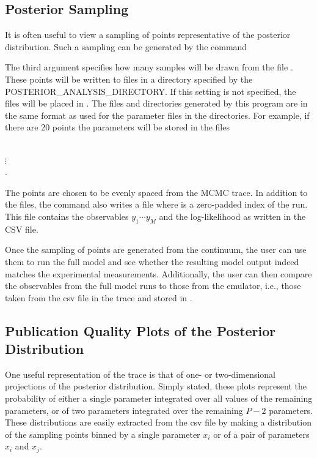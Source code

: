  \subsection{Posterior Sampling}\label{subsec:PosteriorSampling}

 It is often useful to view a sampling of points
 representative of the posterior distribution. Such a
 sampling can be generated by the command


The third argument specifies how many samples will be drawn from the file . These points will be written to files in a directory specified by the POSTERIOR\_ANALYSIS\_DIRECTORY. If this setting is not specified, the files will be placed in . The files and directories generated by this program are in the same format as used for the
 parameter files in the  directories. For
 example, if there are 20 points the parameters will be
 stored in the files

\\
$\vdots$\\
.

 The points are chosen to be evenly spaced from the MCMC
 trace. In addition to the  files, the
 command also writes a file
  where  is a zero-padded index of the run. This
 file contains the observables $y_1\cdots y_M$ and the
 log-likelihood as written in the CSV file.

 Once the sampling of points are generated from the
 continuum, the user can use them to run the full model and
 see whether the resulting model output indeed matches the
 experimental measurements. Additionally, the user can then
 compare the observables from the full model runs to those
 from the emulator, i.e., those taken from the csv file in
 the trace and stored in
 .

\subsection{Publication Quality Plots of the Posterior Distribution}\label{subsec:PublicationQualityPlots}

One useful representation of the trace is that of one- or two-dimensional projections of the posterior distribution. Simply stated, these plots represent the probability of either a single parameter integrated over all values of the remaining parameters, or of two parameters integrated over the remaining $P-2$ parameters. These distributions are easily extracted from the csv file by making a distribution of the sampling points binned by a single parameter $x_i$ or of a pair of parameters $x_i$ and $x_j$.

